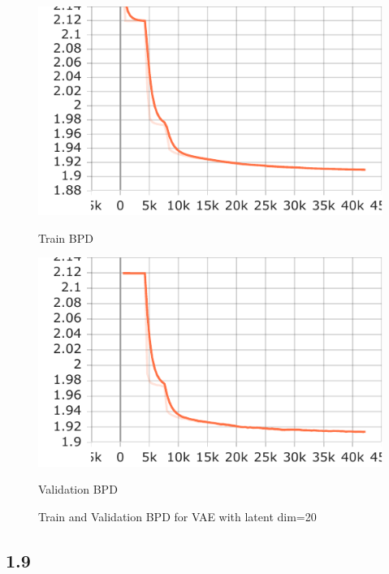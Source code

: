 \documentclass{article}
\begin{document}
\begin{figure}[H]
    \centering
    \begin{minipage}{0.45\textwidth}
        \centering
        \includegraphics[width=\textwidth]{images/train_bpd.pdf}
        \caption{Train BPD}
        \label{fig:train_bpd}
    \end{minipage}
    \hfill
    \begin{minipage}{0.45\textwidth}
        \centering
        \includegraphics[width=\textwidth]{images/val_bpd.pdf}
        \caption{Validation BPD}
        \label{fig:val_bpd}
    \end{minipage}
    \caption{Train and Validation BPD for VAE with latent dim=20}
    \label{fig:vae_bpd}
\end{figure}

\subsection*{1.9}
\end{document}
